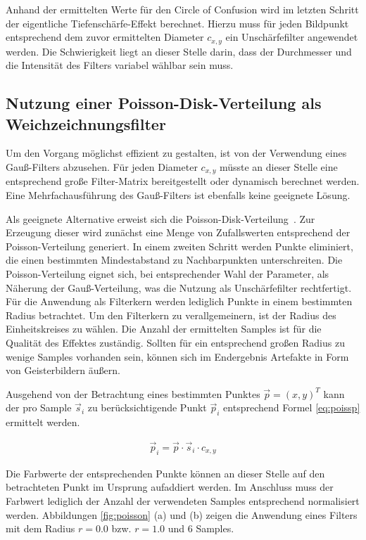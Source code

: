 \documentclass{acmsiggraph}                     %
\begin{document}
Anhand der ermittelten Werte für den Circle of Confusion wird im letzten Schritt der eigentliche Tiefenschärfe-Effekt berechnet. Hierzu muss für jeden Bildpunkt entsprechend dem zuvor ermittelten Diameter $c_{x,y}$ ein Unschärfefilter angewendet werden. Die Schwierigkeit liegt an dieser Stelle darin, dass der Durchmesser und die Intensität des Filters variabel wählbar sein muss.

\subsection{Nutzung einer Poisson-Disk-Verteilung als Weichzeichnungsfilter}

Um den Vorgang möglichst effizient zu gestalten, ist von der Verwendung eines Gauß-Filters abzusehen. Für jeden Diameter $c_{x,y}$ müsste an dieser Stelle eine entsprechend große Filter-Matrix bereitgestellt oder dynamisch berechnet werden. Eine Mehrfachausführung des Gauß-Filters ist ebenfalls keine geeignete Lösung.

Als geeignete Alternative erweist sich die Poisson-Disk-Verteilung~\cite{Engel:2004uq}. Zur Erzeugung dieser wird zunächst eine Menge von Zufallswerten entsprechend der Poisson-Verteilung generiert. In einem zweiten Schritt werden Punkte eliminiert, die einen bestimmten Mindestabstand zu Nachbarpunkten unterschreiten. Die Poisson-Verteilung eignet sich, bei entsprechender Wahl der Parameter, als Näherung der Gauß-Verteilung, was die Nutzung als Unschärfefilter rechtfertigt. Für die Anwendung als Filterkern werden lediglich Punkte in einem bestimmten Radius betrachtet. Um den Filterkern zu verallgemeinern, ist der Radius des Einheitskreises zu wählen. Die Anzahl der ermittelten Samples ist für die Qualität des Effektes zuständig. Sollten für ein entsprechend großen Radius zu wenige Samples vorhanden sein, können sich im Endergebnis Artefakte in Form von Geisterbildern äußern.

Ausgehend von der Betrachtung eines bestimmten Punktes $\vec{p} = \left(x,y\right)^T$ kann der pro Sample $\vec{s}_{i}$ zu berücksichtigende Punkt $\vec{p}_i$ entsprechend Formel \ref{eq:poissp} ermittelt werden.

\begin{align}
	 \label{eq:poissp}
	\vec{p}_i = \vec{p} \cdot \vec{s}_i \cdot c_{x,y}
\end{align}

Die Farbwerte der entsprechenden Punkte können an dieser Stelle auf den betrachteten Punkt im Ursprung aufaddiert werden. Im Anschluss muss der Farbwert lediglich der Anzahl der verwendeten Samples entsprechend normalisiert werden. Abbildungen \ref{fig:poisson} (a) und (b) zeigen die Anwendung eines Filters mit dem Radius $r = 0.0$ bzw. $r = 1.0$ und 6 Samples.
\end{document}
